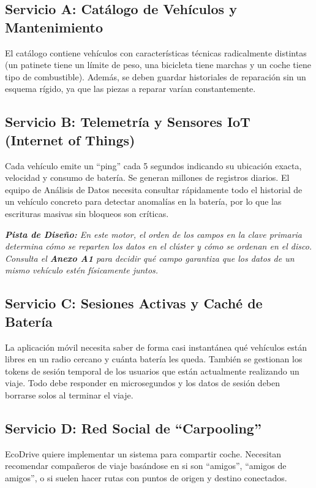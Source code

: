\documentclass[12pt,a4paper]{article}
\begin{document}
\subsection*{Servicio A: Catálogo de Vehículos y Mantenimiento}
El catálogo contiene vehículos con características técnicas radicalmente distintas (un patinete tiene un límite de peso, una bicicleta tiene marchas y un coche tiene tipo de combustible). Además, se deben guardar historiales de reparación sin un esquema rígido, ya que las piezas a reparar varían constantemente.

\subsection*{Servicio B: Telemetría y Sensores IoT (Internet of Things)}
Cada vehículo emite un \enquote{ping} cada 5 segundos indicando su ubicación exacta, velocidad y consumo de batería. Se generan millones de registros diarios. El equipo de Análisis de Datos necesita consultar rápidamente todo el historial de un vehículo concreto para detectar anomalías en la batería, por lo que las escrituras masivas sin bloqueos son críticas.

\textit{\textbf{Pista de Diseño:} En este motor, el orden de los campos en la clave primaria determina cómo se reparten los datos en el clúster y cómo se ordenan en el disco. Consulta el \textbf{Anexo A1} para decidir qué campo garantiza que los datos de un mismo vehículo estén físicamente juntos.}

\subsection*{Servicio C: Sesiones Activas y Caché de Batería}
La aplicación móvil necesita saber de forma casi instantánea qué vehículos están libres en un radio cercano y cuánta batería les queda. También se gestionan los tokens de sesión temporal de los usuarios que están actualmente realizando un viaje. Todo debe responder en microsegundos y los datos de sesión deben borrarse solos al terminar el viaje.

\subsection*{Servicio D: Red Social de \enquote{Carpooling}}
EcoDrive quiere implementar un sistema para compartir coche. Necesitan recomendar compañeros de viaje basándose en si son \enquote{amigos}, \enquote{amigos de amigos}, o si suelen hacer rutas con puntos de origen y destino conectados.
\end{document}

